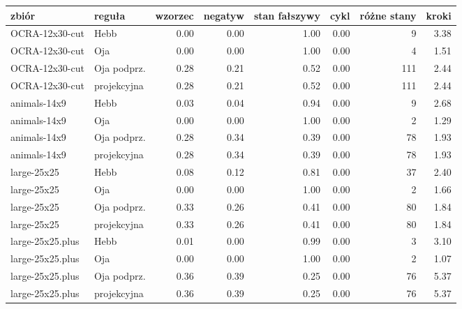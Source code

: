 \begin{tabular}{llrrrrrr}

\toprule

zbiór & reguła & wzorzec & negatyw & stan fałszywy & cykl & różne stany & kroki \\

\midrule

OCRA-12x30-cut & Hebb & 0.00 & 0.00 & 1.00 & 0.00 & 9 & 3.38 \\

OCRA-12x30-cut & Oja & 0.00 & 0.00 & 1.00 & 0.00 & 4 & 1.51 \\

OCRA-12x30-cut & Oja podprz. & 0.28 & 0.21 & 0.52 & 0.00 & 111 & 2.44 \\

OCRA-12x30-cut & projekcyjna & 0.28 & 0.21 & 0.52 & 0.00 & 111 & 2.44 \\

animals-14x9 & Hebb & 0.03 & 0.04 & 0.94 & 0.00 & 9 & 2.68 \\

animals-14x9 & Oja & 0.00 & 0.00 & 1.00 & 0.00 & 2 & 1.29 \\

animals-14x9 & Oja podprz. & 0.28 & 0.34 & 0.39 & 0.00 & 78 & 1.93 \\

animals-14x9 & projekcyjna & 0.28 & 0.34 & 0.39 & 0.00 & 78 & 1.93 \\

large-25x25 & Hebb & 0.08 & 0.12 & 0.81 & 0.00 & 37 & 2.40 \\

large-25x25 & Oja & 0.00 & 0.00 & 1.00 & 0.00 & 2 & 1.66 \\

large-25x25 & Oja podprz. & 0.33 & 0.26 & 0.41 & 0.00 & 80 & 1.84 \\

large-25x25 & projekcyjna & 0.33 & 0.26 & 0.41 & 0.00 & 80 & 1.84 \\

large-25x25.plus & Hebb & 0.01 & 0.00 & 0.99 & 0.00 & 3 & 3.10 \\

large-25x25.plus & Oja & 0.00 & 0.00 & 1.00 & 0.00 & 2 & 1.07 \\

large-25x25.plus & Oja podprz. & 0.36 & 0.39 & 0.25 & 0.00 & 76 & 5.37 \\

large-25x25.plus & projekcyjna & 0.36 & 0.39 & 0.25 & 0.00 & 76 & 5.37 \\


\end{tabular}
